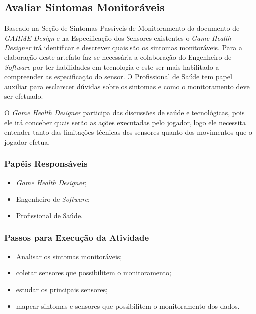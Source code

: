 \subsection{Avaliar Sintomas Monitoráveis}
Baseado na Seção de Sintomas Passíveis de Monitoramento do documento de \textit{GAHME Design} e na Especificação dos Sensores existentes o \textit{Game Health Designer} irá identificar e descrever quais são os sintomas monitoráveis. Para a elaboração deste artefato faz-se necessária a colaboração do Engenheiro de \textit{Software} por ter habilidades em tecnologia e este ser mais habilitado a compreender as especificação do sensor. O Profissional de Saúde tem papel auxiliar para esclarecer dúvidas sobre os sintomas e como o monitoramento deve ser efetuado.

O \textit{Game Health Designer} participa das discussões de saúde e tecnológicas, pois ele irá conceber quais serão as ações executadas pelo jogador, logo ele necessita entender tanto das limitações técnicas dos sensores quanto dos movimentos que o jogador efetua. 


\subsubsection{Papéis Responsáveis}
\begin{itemize}
	\item \textit{Game Health Designer};
	\item Engenheiro de \textit{Software};
	\item Profissional de Saúde.
\end{itemize}

\subsubsection{Passos para Execução da Atividade}
\begin{itemize}
	\item Analisar os sintomas monitoráveis;
	\item coletar sensores que possibilitem o monitoramento;
	\item estudar os principais sensores;
	\item mapear sintomas e sensores que possibilitem o monitoramento dos dados.
\end{itemize}

